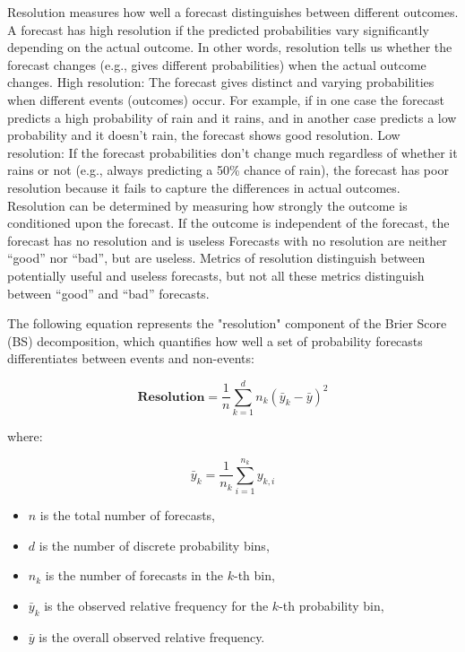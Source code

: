 \documentclass[11pt]{article}
\begin{document}
Resolution measures how well a forecast distinguishes between different outcomes. A forecast has high resolution if the predicted probabilities vary significantly depending on the actual outcome. In other words, resolution tells us whether the forecast changes (e.g., gives different probabilities) when the actual outcome changes.
High resolution: The forecast gives distinct and varying probabilities when different events (outcomes) occur. For example, if in one case the forecast predicts a high probability of rain and it rains, and in another case predicts a low probability and it doesn’t rain, the forecast shows good resolution.
Low resolution: If the forecast probabilities don’t change much regardless of whether it rains or not (e.g., always predicting a 50\% chance of rain), the forecast has poor resolution because it fails to capture the differences in actual outcomes.
Resolution can be determined by measuring how strongly the outcome is conditioned upon the forecast.
If the outcome is independent of the forecast, the forecast has no resolution and is useless
Forecasts with no resolution are neither “good” nor “bad”, but are useless. 
Metrics of resolution distinguish between potentially useful and useless forecasts, but not all these metrics distinguish between “good” and “bad” forecasts.

The following equation represents the "resolution" component of the Brier Score (BS) decomposition, which quantifies how well a set of probability forecasts differentiates between events and non-events:

\begin{equation}
\textbf {Resolution} = \frac{1}{n} \sum_{k=1}^{d} n_k \left( \bar{y}_k - \bar{y} \right)^2
\end{equation}

where:

\begin{equation}
\bar{y}_k = \frac{1}{n_k} \sum_{i=1}^{n_k} y_{k,i}
\end{equation}

\begin{itemize}
    \item $n$ is the total number of forecasts,
    \item $d$ is the number of discrete probability bins,
    \item $n_k$ is the number of forecasts in the $k$-th bin,
    \item $\bar{y}_k$ is the observed relative frequency for the $k$-th probability bin,
    \item $\bar{y}$ is the overall observed relative frequency.
\end{itemize}
\end{document}
